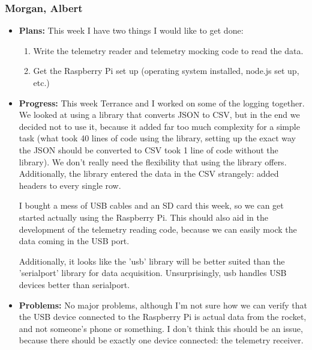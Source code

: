 \documentclass[10pt,draftclsnofoot,onecolumn]{IEEEtran}
\begin{document}
\subsubsection{Morgan, Albert}
\begin{itemize}
	\item \textbf{Plans: }
	This week I have two things I would like to get done:

	\begin{enumerate}
		\item Write the telemetry reader and telemetry mocking code to read the data.
		\item Get the Raspberry Pi set up (operating system installed, node.js set up, etc.)
	\end{enumerate}

	\item \textbf{Progress: }
	This week Terrance and I worked on some of the logging together. We looked at using a library that converts JSON to CSV, but in the end we decided not to use it, because it added far too much complexity for a simple task (what took 40 lines of code using the library, setting up the exact way the JSON should be converted to CSV took 1 line of code without the library). We don't really need the flexibility that using the library offers. Additionally, the library entered the data in the CSV strangely: added headers to every single row.

	I bought a mess of USB cables and an SD card this week, so we can get started actually using the Raspberry Pi. This should also aid in the development of the telemetry reading code, because we can easily mock the data coming in the USB port.

	Additionally, it looks like the 'usb' library will be better suited than the 'serialport' library for data acquisition. Unsurprisingly, usb handles USB devices better than serialport.
	\item \textbf{Problems: }
	No major problems, although I'm not sure how we can verify that the USB device connected to the Raspberry Pi is actual data from the rocket, and not someone's phone or something. I don't think this should be an issue, because there should be exactly one device connected: the telemetry receiver.
\end{itemize}
\end{document}
